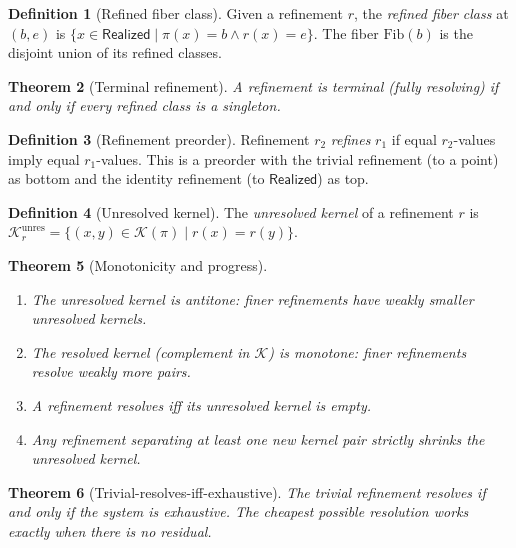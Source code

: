 \documentclass[11pt,a4paper]{article}
\theoremstyle{plain}
\newtheorem{theorem}{Theorem}[section]
\theoremstyle{definition}
\newtheorem{definition}[theorem]{Definition}
\theoremstyle{remark}
\newcommand{\Real}{\mathsf{Realized}}
\newcommand{\compare}{\pi}
\newcommand{\Fib}{\mathrm{Fib}}
\newcommand{\Ker}{\mathcal{K}}
\begin{document}
\begin{definition}[Refined fiber class]\label{def:refined-class}
Given a refinement $r$, the \emph{refined fiber class} at $(b, e)$ is
$\{x \in \Real \mid \compare(x) = b \land r(x) = e\}$. The fiber $\Fib(b)$
is the disjoint union of its refined classes.
\end{definition}

\begin{theorem}[Terminal refinement]\label{thm:terminal}
A refinement is terminal (fully resolving) if and only if every refined class
is a singleton.
\end{theorem}

\begin{definition}[Refinement preorder]\label{def:refines-to}
Refinement $r_2$ \emph{refines} $r_1$ if equal $r_2$-values imply equal
$r_1$-values. This is a preorder with the trivial refinement (to a point)
as bottom and the identity refinement (to $\Real$) as top.
\end{definition}

\begin{definition}[Unresolved kernel]\label{def:unresolved}
The \emph{unresolved kernel} of a refinement $r$ is
$\Ker^{\mathrm{unres}}_r = \{(x,y) \in \Ker(\compare) \mid r(x) = r(y)\}$.
\end{definition}

\begin{theorem}[Monotonicity and progress]\label{thm:monotone}
\leavevmode
\begin{enumerate}[label=(\roman*),nosep]
\item The unresolved kernel is antitone: finer refinements have weakly smaller
      unresolved kernels.
\item The resolved kernel (complement in $\Ker$) is monotone: finer refinements
      resolve weakly more pairs.
\item A refinement resolves iff its unresolved kernel is empty.
\item Any refinement separating at least one new kernel pair strictly shrinks the
      unresolved kernel.
\end{enumerate}
\end{theorem}

\begin{theorem}[Trivial-resolves-iff-exhaustive]\label{thm:triv-res}
The trivial refinement resolves if and only if the system is exhaustive.
The cheapest possible resolution works exactly when there is no residual.
\end{theorem}
\end{document}
